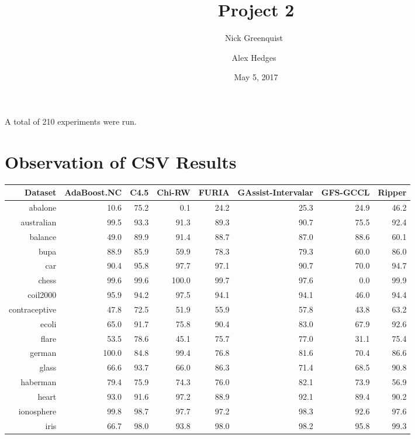 \documentclass[a4paper,11pt]{article}
\title{Project 2}
\date{May 5, 2017}
\author{
  Nick Greenquist\
  \and
  Alex Hedges\
}
\begin{document}
\pagestyle{empty}
\maketitle
\thispagestyle{empty}

A total of 210 experiments were run.

\section{Observation of CSV Results}

\begin{table}[!htp]
\centering\scriptsize
\begin{tabular}{
|r|r|r|r|r|r|r|r|}
\hline
 
Dataset & AdaBoost.NC & C4.5 & Chi-RW & FURIA & GAssist-Intervalar & GFS-GCCL & Ripper\\
\hline
abalone & 10.6 & 75.2 & 0.1 & 24.2 & 25.3 & 24.9 & 46.2\\
\hline
australian & 99.5 & 93.3 & 91.3 & 89.3 & 90.7 & 75.5 & 92.4\\
\hline
balance & 49.0 & 89.9 & 91.4 & 88.7 & 87.0 & 88.6 & 60.1\\
\hline
bupa & 88.9 & 85.9 & 59.9 & 78.3 & 79.3 & 60.0 & 86.0\\
\hline
car & 90.4 & 95.8 & 97.7 & 97.1 & 90.7 & 70.0 & 94.7\\
\hline
chess & 99.6 & 99.6 & 100.0 & 99.7 & 97.6 & 0.0 & 99.9\\
\hline
coil2000 & 95.9 & 94.2 & 97.5 & 94.1 & 94.1 & 46.0 & 94.4\\
\hline
contraceptive & 47.8 & 72.5 & 51.9 & 55.9 & 57.8 & 43.8 & 63.2\\
\hline
ecoli & 65.0 & 91.7 & 75.8 & 90.4 & 83.0 & 67.9 & 92.6\\
\hline
flare & 53.5 & 78.6 & 45.1 & 75.7 & 77.0 & 31.1 & 75.4\\
\hline
german & 100.0 & 84.8 & 99.4 & 76.8 & 81.6 & 70.4 & 86.6\\
\hline
glass & 66.6 & 93.7 & 66.0 & 86.3 & 71.4 & 68.5 & 90.8\\
\hline
haberman & 79.4 & 75.9 & 74.3 & 76.0 & 82.1 & 73.9 & 56.9\\
\hline
heart & 93.0 & 91.6 & 97.2 & 88.9 & 92.1 & 89.4 & 90.2\\
\hline
ionosphere & 99.8 & 98.7 & 97.7 & 97.2 & 98.3 & 92.6 & 97.6\\
\hline
iris & 66.7 & 98.0 & 93.8 & 98.0 & 98.2 & 95.8 & 99.3\\
\hline

\end{tabular}
\end{table}
\end{document}
